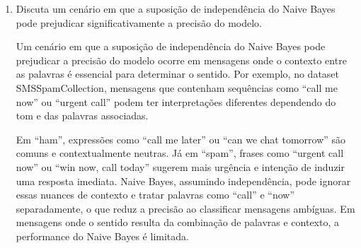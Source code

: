 \begin{enumerate}
        
    \item Discuta um cenário em que a suposição de independência do Naive Bayes pode prejudicar significativamente a precisão do modelo.
    \begin{tcolorbox}[title=Resposta:]
        Um cenário em que a suposição de independência do Naive Bayes pode prejudicar a precisão do modelo ocorre em mensagens onde o contexto entre as palavras é essencial para determinar o sentido. Por exemplo, no dataset SMSSpamCollection, mensagens que contenham sequências como ``call me now'' ou ``urgent call'' podem ter interpretações diferentes dependendo do tom e das palavras associadas. 
        
        Em ``ham'', expressões como ``call me later'' ou ``can we chat tomorrow'' são comuns e contextualmente neutras. Já em ``spam'', frases como ``urgent call now'' ou ``win now, call today'' sugerem mais urgência e intenção de induzir uma resposta imediata. Naive Bayes, assumindo independência, pode ignorar essas nuances de contexto e tratar palavras como ``call'' e ``now'' separadamente, o que reduz a precisão ao classificar mensagens ambíguas. Em mensagens onde o sentido resulta da combinação de palavras e contexto, a performance do Naive Bayes é limitada.
        \end{tcolorbox}
        
\end{enumerate}
